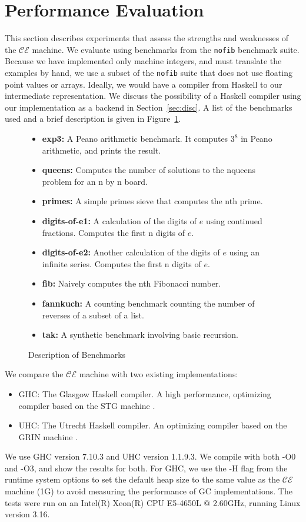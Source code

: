 \section{Performance Evaluation} \label{sec:eval}

This section describes experiments that assess the strengths and weaknesses of
the $\mathcal{CE}$ machine. We evaluate using benchmarks from the \texttt{nofib}
benchmark suite. Because we have implemented only machine integers, and must
translate the examples by hand, we use a subset of the \texttt{nofib} suite that
does not use floating point values or arrays. Ideally, we would have a compiler
from Haskell to our intermediate representation. We discuss the possibility of a
Haskell compiler using our implementation as a backend in
Section~\ref{sec:disc}. A list of the benchmarks used and a brief description is
given in Figure~\ref{fig:bench}.

\begin{figure}
\begin{itemize}
\item \textbf{exp3:} A Peano arithmetic benchmark. It computes $3^8$ in
Peano arithmetic, and prints the result. 
\item \textbf{queens:} Computes the number of solutions to the nqueens problem
for an n by n board.
\item \textbf{primes:} A simple primes sieve that computes the nth prime.
\item \textbf{digits-of-e1:} A calculation of the digits of $e$ using continued
fractions. Computes the first n digits of $e$.
\item \textbf{digits-of-e2:} Another calculation of the digits of $e$ using an
infinite series. Computes the first n digits of $e$. 
\item \textbf{fib:} Naively computes the nth Fibonacci number.
\item \textbf{fannkuch:} A counting benchmark counting the number of reverses of
a subset of a list.
\item \textbf{tak:} A synthetic benchmark involving basic recursion.
\end{itemize}
\caption{Description of Benchmarks}
\label{fig:bench}
\end{figure}

We compare the $\mathcal{CE}$ machine with two existing implementations:

\begin{itemize}
\item GHC: The Glasgow Haskell compiler. A high performance, optimizing compiler
based on the STG machine \cite{jonesstg}.
\item UHC: The Utrecht Haskell compiler. An optimizing compiler based on the
GRIN machine \cite{boquist1997grin,dijkstra2009architecture}.
\end{itemize}

We use GHC version 7.10.3 and UHC version 1.1.9.3. We compile with both -O0 and
-O3, and show the results for both. For GHC, we use the -H flag from the runtime
system options to set the default heap size to the same value as the
$\mathcal{CE}$ machine (1G) to avoid measuring the performance of GC
implementations. The tests were run on an Intel(R) Xeon(R) CPU E5-4650L @
2.60GHz, running Linux version 3.16. 
